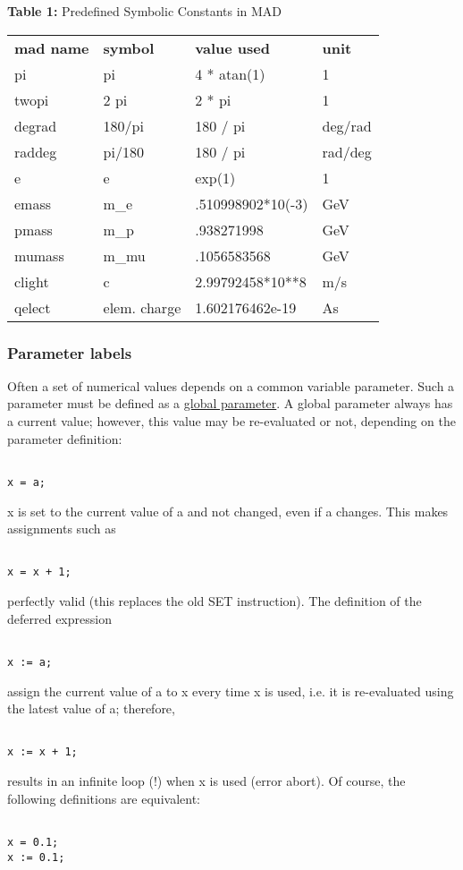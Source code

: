 \begin{table}
\begin{center}
{\textbf{Table 1:} Predefined Symbolic Constants in MAD}
\begin{tabular}{l|l|l|l}
\textbf{mad name} & \textbf{symbol} & \textbf{value used} & \textbf{unit} \\ 
pi & pi & 4 * atan(1) & 1 \\ 
twopi & 2 pi & 2 * pi & 1 \\ 
degrad & 180/pi & 180 / pi & deg/rad \\ 
raddeg & pi/180 & 180 / pi & rad/deg \\ 
e & e & exp(1) & 1 \\ 
emass & m\_e & .510998902*10(-3) & GeV \\ 
pmass & m\_p & .938271998 & GeV \\ 
mumass & m\_mu & .1056583568 & GeV \\ 
clight & c & 2.99792458*10**8 & m/s \\ 
qelect & elem. charge & 1.602176462e-19 & As
\end{tabular}
\end{center}
\end{table}

\subsubsection{Parameter labels} Often a set of numerical values depends on a common variable parameter. Such a parameter must be defined as a \href{parameter.html}{global parameter}. A global parameter always has a current value; however, this value may be re-evaluated or not, depending on the parameter definition: 
\begin{verbatim}

x = a;
\end{verbatim} x is set to the current value of a and not changed, even if a changes. This makes assignments such as 
\begin{verbatim}

x = x + 1;
\end{verbatim} perfectly valid (this replaces the old SET instruction). The definition of the deferred expression 
\begin{verbatim}

x := a;
\end{verbatim} assign the current value of a to x every time x is used, i.e. it is re-evaluated using the latest value of a; therefore, 
\begin{verbatim}

x := x + 1;
\end{verbatim} results in an infinite loop (!) when x is used (error abort). Of course, the following definitions are equivalent: 
\begin{verbatim}

x = 0.1;
x := 0.1;
\end{verbatim}

